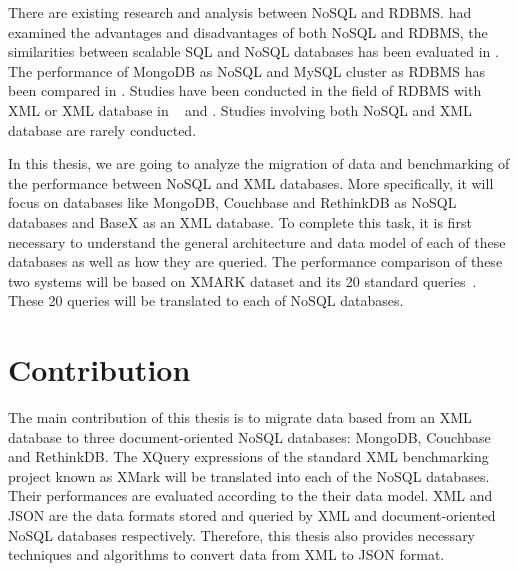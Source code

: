 	\par		
	There are existing research and analysis between NoSQL and RDBMS. \citet{nance2013nosql} had examined the advantages and disadvantages of both NoSQL and RDBMS, the similarities between scalable SQL and NoSQL databases has been evaluated in \cite{cattell2011scalable}. The performance of MongoDB as NoSQL and MySQL cluster as  RDBMS has been compared in   \cite{hadjigeorgiou2013rdbms}.   Studies have been conducted in the field of RDBMS with XML or XML database in  ~\cite{jiang2002xparent} and \cite{shanmugasundaram1999relational}. Studies involving both NoSQL and XML database are rarely conducted.
\par
In this thesis, we are going to analyze the migration of data and benchmarking of the performance between NoSQL and XML databases. More specifically, it will focus on databases like MongoDB, Couchbase and RethinkDB as NoSQL databases and BaseX as an XML database. To complete this task, it is first necessary to understand the general architecture and data model of each of these databases as well as how they are queried. The performance comparison of these two systems will be based on XMARK dataset and its 20 standard queries~\citep{xmark/original}. These 20 queries will be translated to each of NoSQL databases.
	
	\section{Contribution}
		The main contribution of this thesis is to migrate data based from an XML database to three document-oriented NoSQL databases: MongoDB, Couchbase and RethinkDB. The XQuery expressions of the standard XML benchmarking project known as XMark will be  translated  into each of the NoSQL databases. Their performances are  evaluated according to the their data model. XML and JSON are the data formats stored and queried by XML and document-oriented NoSQL databases respectively. Therefore, this thesis also provides necessary techniques and algorithms to convert data from XML to JSON format.
	    
		
